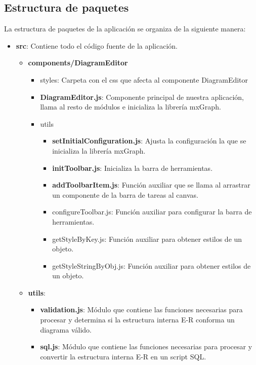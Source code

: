\subsection{Estructura de paquetes}
La estructura de paquetes de la aplicación se organiza de la siguiente manera:
\begin{itemize}
    \item \textbf{src}: Contiene todo el código fuente de la aplicación.
    \begin{itemize}
        \item \textbf{components/DiagramEditor}
        \begin{itemize}
            \item styles: Carpeta con el css que afecta al componente DiagramEditor
            \item \textbf{DiagramEditor.js}: Componente principal de nuestra aplicación, llama al resto de módulos e inicializa la librería mxGraph.
            \item utils
            \begin{itemize}
                \item \textbf{setInitialConfiguration.js}: Ajusta la configuración la que se inicializa la librería mxGraph.
                \item \textbf{initToolbar.js}: Inicializa la barra de herramientas.
                \item \textbf{addToolbarItem.js}: Función auxiliar que se llama al arrastrar un componente de la barra de tareas al canvas.
                \item configureToolbar.js: Función auxiliar para configurar la barra de herramientas.
                \item getStyleByKey.js: Función auxiliar para obtener estilos de un objeto.
                \item getStyleStringByObj.js: Función auxiliar para obtener estilos de un objeto.
            \end{itemize}
        \end{itemize}
        \item \textbf{utils}:
        \begin{itemize}
            \item \textbf{validation.js}: Módulo que contiene las funciones necesarias para procesar y determina si la estructura interna E-R conforma un diagrama válido.
            \item \textbf{sql.js}: Módulo que contiene las funciones necesarias para procesar y convertir la estructura interna E-R en un script SQL.
        \end{itemize}
    \end{itemize}
\end{itemize}

